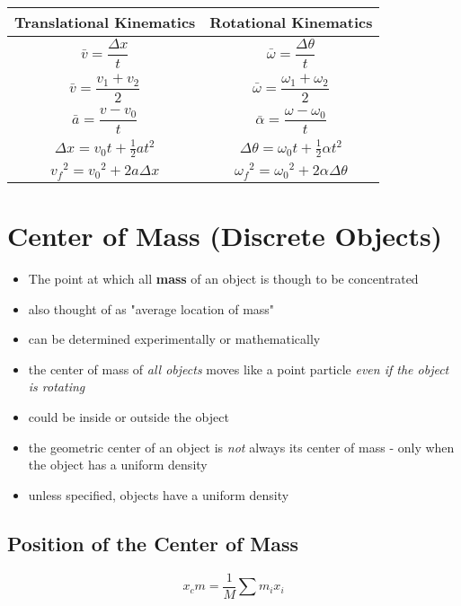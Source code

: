 \documentclass[titlepage]{article}
\begin{document}
\begin{table}[H]
    \makegapedcells
    \begin{tabular}{c|c}
        \textbf{Translational Kinematics}    & \textbf{Rotational Kinematics}                         \\
        \hline
        $\bar{v} = \dfrac{\Delta x}{t}$      & $\bar{\omega} = \dfrac{\Delta \theta}{t}$              \\
        $\bar{v} = \dfrac{v_1 + v_2}{2}$     & $\bar{\omega} = \dfrac{\omega_1 + \omega_2}{2}$        \\
        $\bar{a} = \dfrac{v - v_0}{t}$       & $\bar{\alpha} = \dfrac{\omega - \omega_0}{t}$          \\
        $\Delta x = v_0 t + \frac{1}{2}at^2$ & $\Delta \theta = \omega_0 t + \frac{1}{2} \alpha t^2$  \\
        ${v_{f}}^2 = {v_0}^2 + 2a\Delta x$   & ${\omega_{f}}^2 = {\omega_0}^2 + 2\alpha\Delta \theta$ \\
    \end{tabular}
\end{table}

\section{Center of Mass (Discrete Objects)}
\begin{itemize}
    \item The point at which all \textbf{mass} of an object is though to be concentrated
    \item also thought of as "average location of mass"
    \item can be determined experimentally or mathematically
    \item the center of mass of \emph{all objects} moves like a point particle \emph{even if the object is rotating}
    \item could be inside or outside the object
    \item the geometric center of an object is \emph{not} always its center of mass - only when the object has a uniform density
    \item unless specified, objects have a uniform density
\end{itemize}

\subsection{Position of the Center of Mass}
\[x_cm = \frac{1}{M}\sum m_i x_i\]
\end{document}
